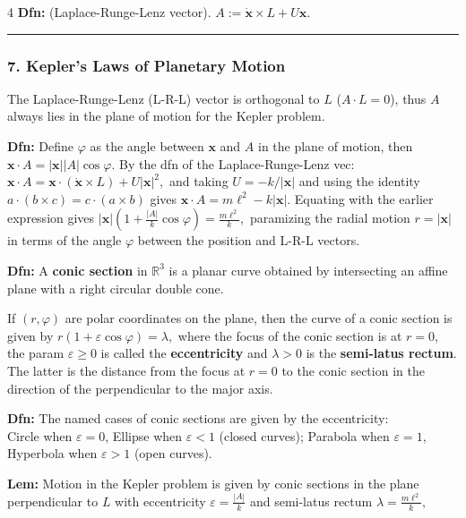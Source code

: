 \documentclass[landscape, 8pt]{extarticle}
\begin{document}
\begin{multicols*}{4}
		\textbf{Dfn:} (Laplace-Runge-Lenz vector).
		$
		A := \dot{\mathbf{x}}\times L + U\mathbf{x}.
		$
		\hrule
		\vspace*{-3pt}
		\subsubsection*{\tiny{7. Kepler's Laws of Planetary Motion}}
		\vspace*{-5pt}
		
		The Laplace-Runge-Lenz (L-R-L) vector is orthogonal to $L$ ($A\cdot L=0$), thus $A$ always lies in the plane of motion for the Kepler problem.
		
		\textbf{Dfn:} Define $\varphi$ as the angle between $\mathbf{x}$ and $A$ in the plane of motion, then
		$
		\mathbf{x}\cdot A = |\mathbf{x}||A|\cos\varphi.
		$
		By the dfn of the Laplace-Runge-Lenz vec:
		$
		\mathbf{x}\cdot A = \mathbf{x}\cdot(\dot{\mathbf{x}}\times L)+U|\mathbf{x}|^2,
		$
		and taking $U=-k/|\mathbf{x}|$ and using the identity $a\cdot(b\times c)=c\cdot(a\times b)$ gives
		$
		\mathbf{x}\cdot A = m\ell^2-k|\mathbf{x}|.
		$
		Equating with the earlier expression gives
		$
		|\mathbf{x}|\left(1+\frac{|A|}{k}\cos\varphi\right)=\frac{m\ell^2}{k},
		$
		paramizing the radial motion $r=|\mathbf{x}|$ in terms of the angle $\varphi$ between the position and L-R-L vectors.
		
		\textbf{Dfn:} A \textbf{conic section} in $\mathbb{R}^3$ is a planar curve obtained by intersecting an affine plane with a right circular double cone.
		
		If $(r,\varphi)$ are polar coordinates on the plane, then the curve of a conic section is given by
		$
		r(1+\varepsilon\cos\varphi)=\lambda,
		$
		where the focus of the conic section is at $r=0$, the param $\varepsilon\geq 0$ is called the \textbf{eccentricity} and $\lambda>0$ is the \textbf{semi-latus rectum}. The latter is the distance from the focus at $r=0$ to the conic section in the direction of the perpendicular to the major axis.
		
		\textbf{Dfn:} The named cases of conic sections are given by the eccentricity:\\
		Circle when $\varepsilon=0$, Ellipse when $\varepsilon<1$
		(closed curves); 
		Parabola when $\varepsilon=1$, Hyperbola when $\varepsilon>1$
		(open curves).
		
		\textbf{Lem:} Motion in the Kepler problem is given by conic sections in the plane perpendicular to $L$ with eccentricity $\varepsilon=\frac{|A|}{k}$ and semi-latus rectum
		$
		\lambda=\frac{m\ell^2}{k},
		$
		

\end{multicols*}
\end{document}
